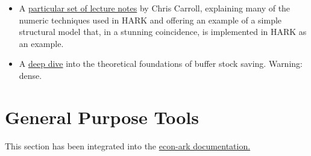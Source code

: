 \documentclass[12pt,titlepage,letterpaper]{econtex}
\begin{document}
{\begin{itemize}
\item A \href{http://www.econ2.jhu.edu/people/ccarroll/SolvingMicroDSOPs/}{particular set of lecture notes} by Chris Carroll, explaining many of the numeric techniques used in HARK and offering an example of a simple structural model that, in a stunning coincidence, is implemented in HARK as an example.

\item A \href{http://www.econ2.jhu.edu/people/ccarroll/BufferStockTheory.pdf}{deep dive} into the theoretical foundations of buffer stock saving.  Warning: dense.

\end{itemize}


\section{General Purpose Tools}\label{sec:GeneralPurposeTools}

This section has been integrated into the \href{https://hark.readthedocs.io/en/latest/ARKitecture.html\#general-purpose-tools}{econ-ark documentation.}

}
\end{document}
